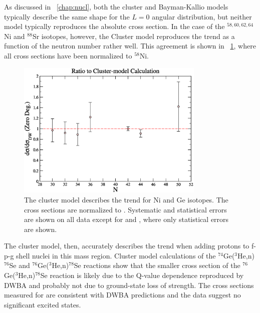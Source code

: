 As discussed in {\chap}~\ref{chap:nucl}, both the cluster and Bayman-Kallio models typically describe the same shape for the $L=0$ angular distribution, but neither model typically reproduces the absolute cross section.  In the case of the $^{58,60,62,64}$Ni and $^{88}$Sr isotopes, however, the Cluster model reproduces the trend as a function of the neutron number rather well.  This agreement is shown in {\fig}~\ref{fig:nickelTrend}, where all cross sections have been normalized to $^{58}$Ni.  
\begin{figure}[!htbp]
\centering
\includegraphics[width=0.8\textwidth]{figures/SigmaNormVsN.eps}
\caption{The cluster model describes the trend for Ni and Ge isotopes.  The cross sections are normalized to .  Systematic and statistical errors are shown on all data except for  and , where only statistical errors are shown.}
\label{fig:nickelTrend}
\end{figure}
The cluster model, then, accurately describes the trend when adding protons to f-p-g shell nuclei in this mass region.  Cluster model calculations of the $^{74}$Ge($^3$He,n)$^{76}$Se and $^{76}$Ge($^3$He,n)$^{78}$Se reactions show that the smaller cross section of the $^{76}$Ge($^3$He,n)$^{78}$Se reaction is likely due to the Q-value dependence reproduced by DWBA and probably not due to ground-state loss of \zp strength.   The cross sections measured for \reaction are consistent with DWBA predictions and the data suggest no significant excited \zp states.

%
% 
% 
